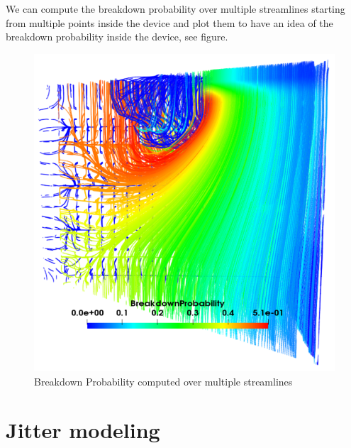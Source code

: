 \documentclass[10pt,a4paper,twocolumn]{article}
\begin{document}
We can compute the breakdown probability over multiple streamlines starting from multiple points inside the device and plot them to have an idea of the breakdown probability inside the device, see figure.

\begin{figure}[h!]
\centering
\includegraphics[scale=0.5]{../pictures/BrPStreamlines.PNG}
\caption{Breakdown Probability computed over multiple streamlines}
\label{fig:Streamlines}
\end{figure}





\section{Jitter modeling}
\end{document}
